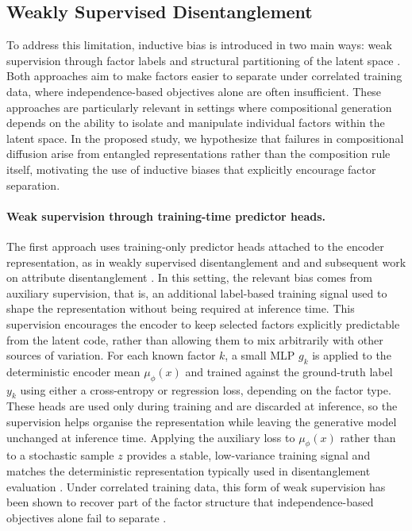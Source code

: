 \subsection{Weakly Supervised Disentanglement}
To address this limitation, inductive bias is introduced in two main ways: weak supervision through factor labels \citep{weakly_supervised_disentanglement, on_disentangled_representation_learning} and structural partitioning of the latent space \citep{louiset2024sepvae}. 
Both approaches aim to make factors easier to separate under correlated training data, where independence-based objectives alone are often insufficient.
These approaches are particularly relevant in settings where compositional generation depends on the ability to isolate and manipulate individual factors within the latent space. 
In the proposed study, we hypothesize that failures in compositional diffusion arise from entangled representations rather than the composition rule itself, motivating the use of inductive biases that explicitly encourage factor separation.


\paragraph{Weak supervision through training-time predictor heads.}
The first approach uses training-only predictor heads attached to the encoder representation, as in weakly supervised disentanglement \citep{weakly_supervised_disentanglement} and and subsequent work on attribute disentanglement \citep{attribute_disentanglement}.
In this setting, the relevant bias comes from auxiliary supervision, that is,
an additional label-based training signal used to shape the representation without being required at inference time. 
This supervision encourages the encoder to keep selected
factors explicitly predictable from the latent code, rather than allowing them to mix
arbitrarily with other sources of variation.
For each known factor $k$, a small MLP $g_k$ is applied
to the deterministic encoder mean $\mu_\phi(x)$ and trained against the ground-truth label
$y_k$ using either a cross-entropy or regression loss, depending on the factor type. These
heads are used only during training and are discarded at inference, so the supervision helps organise the representation while leaving the generative model unchanged at inference time. 
Applying the auxiliary loss to $\mu_\phi(x)$ rather than to a stochastic sample $z$ provides a stable,
low-variance training signal and matches the deterministic representation typically used in
disentanglement evaluation \citep{eastwood2018framework, challeau2019challenging}. Under
correlated training data, this form of weak supervision has been shown to recover part of
the factor structure that independence-based objectives alone fail to separate
\citep{traeuble2021disentangled}.

